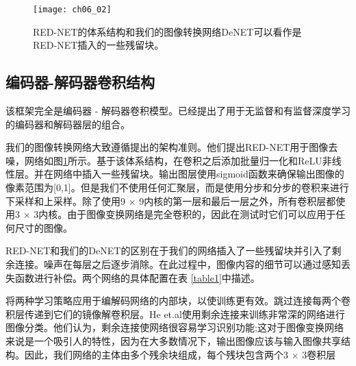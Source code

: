 \begin{figure}[t]
\centering
\texttt{[image: ch06\_02]}
\caption{ RED-NET的体系结构和我们的图像转换网络DeNET可以看作是RED-NET插入的一些残留块。}
\label{fig:ch06_02}
\vspace{-6mm}
\end{figure} 
\subsection{编码器-解码器卷积结构}

该框架完全是编码器 - 解码器卷积模型。已经提出了用于无监督和有监督深度学习的编码器和解码器层的组合\cite{DBLP:conf/iccv/NohHH15,hong2015decoupled,DBLP:conf/cvpr/LongSD15,DBLP:journals/pami/DongLHT16,Mao2016}。

我们的图像转换网络大致遵循\cite{Mao2016}提出的架构准则。他们提出RED-NET用于图像去噪，网络如图\ref{fig:ch06_02}所示。基于该体系结构，在卷积之后添加批量归一化\cite{Ioffe2014Batch}和ReLU非线性层。并在网络中插入一些残留块\cite{he15}。输出图层使用sigmoid函数来确保输出图像的像素范围为[0,1]。但是我们不使用任何汇聚层，而是使用分步和分步的卷积来进行下采样和上采样。除了使用9 $ \times $ 9内核的第一层和最后一层之外，所有卷积层都使用3 $ \times $ 3内核。由于图像变换网络是完全卷积的，因此在测试时它们可以应用于任何尺寸的图像。

RED-NET和我们的DeNET的区别在于我们的网络插入了一些残留块并引入了剩余连接。噪声在每层之后逐步消除。在此过程中，图像内容的细节可以通过感知丢失函数进行补偿。两个网络的具体配置在表 \ref{table1}中描述。

将两种学习策略应用于编解码网络的内部块，以使训练更有效。跳过连接每两个卷积层传递到它们的镜像解卷积层。He et.al\cite{he15}使用剩余连接来训练非常深的网络进行图像分类。他们认为，剩余连接使网络很容易学习识别功能;这对于图像变换网络来说是一个吸引人的特性，因为在大多数情况下，输出图像应该与输入图像共享结构。因此，我们网络的主体由多个残余块组成，每个残块包含两个3 $ \times $ 3卷积层
 
